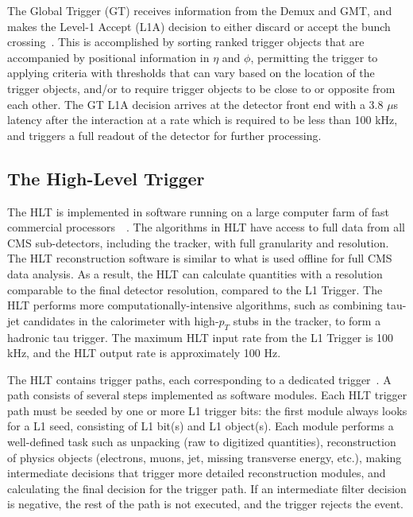 The Global Trigger (GT) receives information from the Demux and GMT, and makes the Level-1 Accept (L1A) decision to either discard or accept the bunch crossing~\cite{CERN-LHCC-2000-038}. This is accomplished by sorting ranked trigger objects that are accompanied by positional information in $\eta$ and $\phi$, permitting the trigger to applying criteria with thresholds that can vary based on the location of the trigger objects, and/or to require trigger objects to be close to or opposite from each other. The GT L1A decision arrives at the detector front end with a 3.8 $\mu$s latency after the interaction at a rate which is required to be less than 100 kHz, and triggers a full readout of the detector for further processing.



\subsection{The High-Level Trigger}
\label{section:phase-1-high-level-trigger}
The HLT is implemented in software running on a large computer farm of fast commercial processors~\cite{CMS-TDR-022-HLT}~\cite{Foudas:2008dt}. The algorithms in HLT have access to full data from all CMS sub-detectors, including the tracker, with full granularity and resolution. The HLT reconstruction software is similar to what is used offline for full CMS data analysis. As a result, the HLT can calculate quantities with a resolution comparable to the final detector resolution, compared to the L1 Trigger. The HLT performs more computationally-intensive algorithms, such as combining tau-jet candidates in the calorimeter with high-$p_T$ stubs in the tracker, to form a hadronic tau trigger. The maximum HLT input rate from the L1 Trigger is 100 kHz, and the HLT output rate is approximately 100 Hz. 

The HLT contains trigger paths, each corresponding to a dedicated trigger~\cite{twiki_SoftwareGuide_HLT}.  A path consists of several steps implemented as software modules. Each HLT trigger path must be seeded by one or more L1 trigger bits: the first module always looks for a L1 seed, consisting of L1 bit(s) and L1 object(s). Each module performs a well-defined task such as unpacking (raw to digitized quantities), reconstruction of physics objects (electrons, muons, jet, missing transverse energy, etc.), making intermediate decisions that trigger more detailed reconstruction modules, and calculating the final decision for the trigger path. If an intermediate filter decision is negative, the rest of the path is not executed, and the trigger rejects the event.



